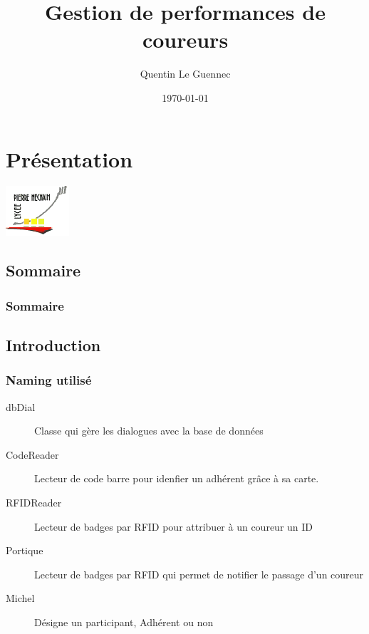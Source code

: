 \documentclass[10pt,handout,usepdftitle=false,envcountsect]{beamer}
\title{Gestion de performances de coureurs}
\author{Quentin Le Guennec}
\institute{Lycée Pierre Méchain Laon}
\date{\today}
\begin{document}
\section{Présentation}

\begin{frame}
    \includegraphics[scale=0.7]{pierre-mechain.png}
    \maketitle
\end{frame}

\subsection{Sommaire}
\frametitle{Sommaire}
\begin{frame}
    \tableofcontents
\end{frame}

\subsection{Introduction}
\begin{frame}
\frametitle{Naming utilisé}
\begin{description}
    \item[dbDial] Classe qui gère les dialogues avec la base de données
        \newline
    \item[CodeReader] Lecteur de code barre pour idenfier un adhérent grâce à sa carte.
        \newline
    \item[RFIDReader] Lecteur de badges par RFID pour attribuer à un coureur un ID
        \newline
    \item[Portique] Lecteur de badges par RFID qui permet de notifier le passage d'un coureur
        \newline
    \item[Michel] Désigne un participant, Adhérent ou non
\end{description}
\end{frame}
\end{document}
